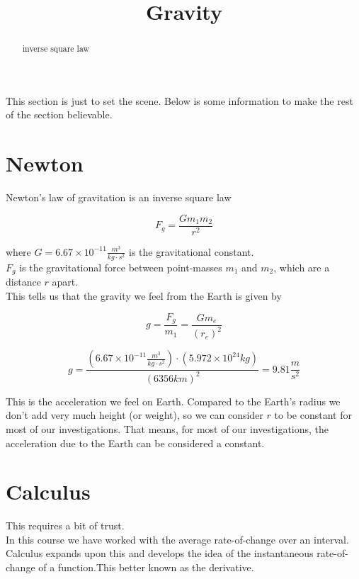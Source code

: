 \documentclass{ximera}
\title{Gravity}
\begin{document}
\begin{abstract}
inverse square law
\end{abstract}
\maketitle




This section is just to set the scene.  Below is some information to make the rest of the section believable. 




\section{Newton}

Newton's law of gravitation is an inverse square law

\[ F_g = \frac{G m_1 m_2}{r^2}    \]




where $G = 6.67 \times 10^{-11} \frac{m^3}{kg \cdot s^2}$ is the gravitational constant. \\


$F_g$ is the gravitational force between point-masses $m_1$ and $m_2$, which are a distance $r$ apart. \\



This tells us that the gravity we feel from the Earth is given by


\[ g = \frac{F_g}{m_1}  = \frac{G m_e}{(r_e)^2}    \]


\[ g = \frac{(6.67 \times 10^{-11} \frac{m^3}{kg \cdot s^2}) \cdot (5.972 \times 10^{24} kg)}{(6356 km)^2} = 9.81 \frac{m}{s^2}   \]


This is the acceleration we feel on Earth.  Compared to the Earth's radius we don't add very much height (or weight), so we can consider $r$ to be constant for most of our investigations.  That means, for most of our investigations, the acceleration due to the Earth can be considered a constant.




\section{Calculus}

This requires a bit of trust.  \\

In this course we have worked with the average rate-of-change over an interval.  Calculus expands upon this and develops the idea of the instantaneous rate-of-change of a function.This better known as the derivative.  
\end{document}
